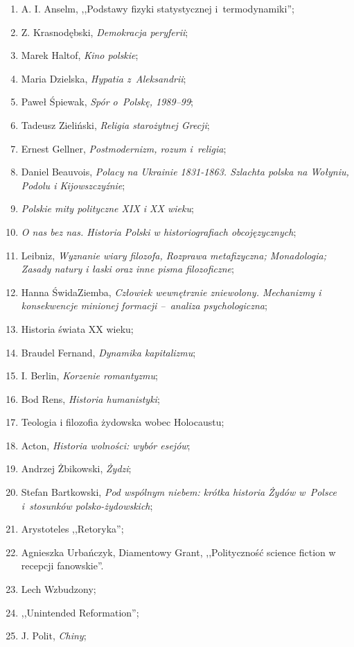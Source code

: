 \documentclass[a4paper,11pt]{article}
\begin{document}
\begin{enumerate}
{    we~wczesnych wierzeniach religijnych};
\item A. I. Anselm, ,,Podstawy fizyki statystycznej i~termodynamiki'';
\item Z. Krasnodębski, \emph{Demokracja peryferii};
\item Marek Haltof, \emph{Kino polskie};
\item Maria Dzielska, \emph{Hypatia z~Aleksandrii};
\item Paweł Śpiewak, \emph{Spór o~Polskę, 1989--99};
\item Tadeusz Zieliński, \emph{Religia starożytnej Grecji};
\item Ernest Gellner, \emph{Postmodernizm, rozum i~religia};
\item Daniel Beauvois, \emph{Polacy na Ukrainie 1831-1863. Szlachta
    polska na Wołyniu, Podolu i Kijowszczyźnie};
\item \emph{Polskie mity polityczne XIX i XX wieku};
\item \emph{O nas bez nas. Historia Polski w historiografiach
    obcojęzycznych};
\item Leibniz, \emph{Wyznanie wiary filozofa, Rozprawa metafizyczna;
    Monadologia; Zasady natury i łaski oraz inne pisma filozoficzne};
\item Hanna Świda\dywiz Ziemba, \emph{Człowiek wewnętrznie zniewolony.
    Mechanizmy i konsekwencje minionej formacji --~analiza
    psychologiczna};
\item Historia świata XX wieku;
\item Braudel Fernand, \emph{Dynamika kapitalizmu};
\item I. Berlin, \emph{Korzenie romantyzmu};
\item Bod Rens, \emph{Historia humanistyki};
\item Teologia i filozofia żydowska wobec Holocaustu;
\item Acton, \emph{Historia wolności: wybór esejów};
\item Andrzej Żbikowski, \emph{Żydzi};
\item Stefan Bartkowski, \emph{Pod wspólnym niebem: krótka historia
    Żydów w~Polsce i~stosunków polsko-żydowskich};
\item Arystoteles ,,Retoryka'';
\item Agnieszka Urbańczyk, Diamentowy Grant, ,,Polityczność science
  fiction w recepcji fanowskie''.
\item Lech Wzbudzony;
\item ,,Unintended Reformation'';
\item J. Polit, \emph{Chiny};

\end{enumerate}
\end{document}
